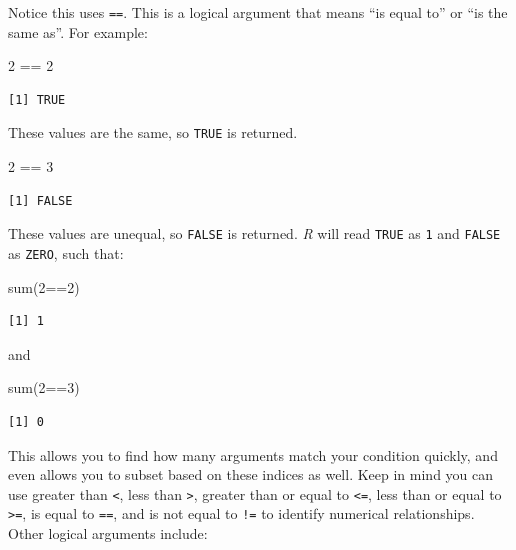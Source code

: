 \documentclass[
  letterpaper,
  DIV=11,
  numbers=noendperiod]{scrreprt}
\newenvironment{Shaded}{\begin{snugshade}}{\end{snugshade}}
\newcommand{\DecValTok}[1]{\textcolor[rgb]{0.68,0.00,0.00}{#1}}
\newcommand{\FunctionTok}[1]{\textcolor[rgb]{0.28,0.35,0.67}{#1}}
\newcommand{\NormalTok}[1]{\textcolor[rgb]{0.00,0.23,0.31}{#1}}
\newcommand{\SpecialCharTok}[1]{\textcolor[rgb]{0.37,0.37,0.37}{#1}}
\begin{document}
Notice this uses \texttt{==}. This is a logical argument that means ``is
equal to'' or ``is the same as''. For example:

\begin{Shaded}
\begin{Highlighting}[]
\DecValTok{2} \SpecialCharTok{==} \DecValTok{2}
\end{Highlighting}
\end{Shaded}

\begin{verbatim}
[1] TRUE
\end{verbatim}

These values are the same, so \texttt{TRUE} is returned.

\begin{Shaded}
\begin{Highlighting}[]
\DecValTok{2} \SpecialCharTok{==} \DecValTok{3}
\end{Highlighting}
\end{Shaded}

\begin{verbatim}
[1] FALSE
\end{verbatim}

These values are unequal, so \texttt{FALSE} is returned. \emph{R} will
read \texttt{TRUE} as \texttt{1} and \texttt{FALSE} as \texttt{ZERO},
such that:

\begin{Shaded}
\begin{Highlighting}[]
\FunctionTok{sum}\NormalTok{(}\DecValTok{2}\SpecialCharTok{==}\DecValTok{2}\NormalTok{)}
\end{Highlighting}
\end{Shaded}

\begin{verbatim}
[1] 1
\end{verbatim}

and

\begin{Shaded}
\begin{Highlighting}[]
\FunctionTok{sum}\NormalTok{(}\DecValTok{2}\SpecialCharTok{==}\DecValTok{3}\NormalTok{)}
\end{Highlighting}
\end{Shaded}

\begin{verbatim}
[1] 0
\end{verbatim}

This allows you to find how many arguments match your condition quickly,
and even allows you to subset based on these indices as well. Keep in
mind you can use greater than \texttt{\textless{}}, less than
\texttt{\textgreater{}}, greater than or equal to \texttt{\textless{}=},
less than or equal to \texttt{\textgreater{}=}, is equal to \texttt{==},
and is not equal to \texttt{!=} to identify numerical relationships.
Other logical arguments include:
\end{document}
